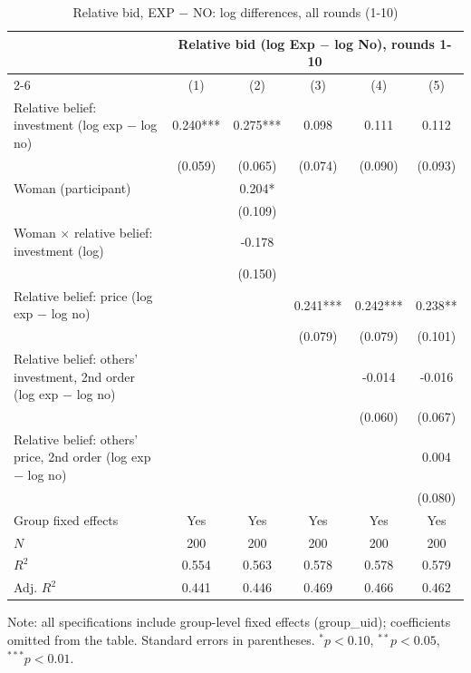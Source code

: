 \begin{table}[!htbp]
  \centering
  \caption{Relative bid, EXP $-$ NO: log differences, all rounds (1-10)}
  \begin{tabular}{l*{5}{c}}
    \toprule
     & \multicolumn{5}{c}{Relative bid (log Exp $-$ log No), rounds 1-10} \\
    \cmidrule(lr){2-6}
     & (1) & (2) & (3) & (4) & (5) \\
    \midrule
Relative belief: investment (log exp $-$ log no) & 0.240*** & 0.275*** & 0.098 & 0.111 & 0.112 \\
 & (0.059) & (0.065) & (0.074) & (0.090) & (0.093) \\
Woman (participant) &  & 0.204* &  &  &  \\
 &  & (0.109) &  &  &  \\
Woman $\times$ relative belief: investment (log) &  & -0.178 &  &  &  \\
 &  & (0.150) &  &  &  \\
Relative belief: price (log exp $-$ log no) &  &  & 0.241*** & 0.242*** & 0.238** \\
 &  &  & (0.079) & (0.079) & (0.101) \\
Relative belief: others' investment, 2nd order (log exp $-$ log no) &  &  &  & -0.014 & -0.016 \\
 &  &  &  & (0.060) & (0.067) \\
Relative belief: others' price, 2nd order (log exp $-$ log no) &  &  &  &  & 0.004 \\
 &  &  &  &  & (0.080) \\
    \midrule
    Group fixed effects & Yes & Yes & Yes & Yes & Yes \\
    $N$ & 200 & 200 & 200 & 200 & 200 \\
    $R^2$ & 0.554 & 0.563 & 0.578 & 0.578 & 0.579 \\
    Adj. $R^2$ & 0.441 & 0.446 & 0.469 & 0.466 & 0.462 \\
    \bottomrule
  \end{tabular}
  \begin{tablenotes}
  \footnotesize
  \item Note: all specifications include group-level fixed effects (group\_uid); coefficients omitted from the table. Standard errors in parentheses. $^{*}p<0.10$, $^{**}p<0.05$, $^{***}p<0.01$.
  \end{tablenotes}
\end{table}
